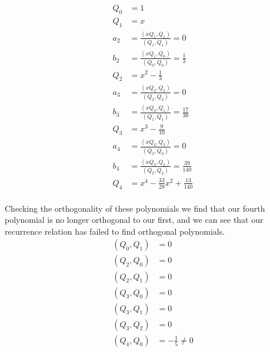 {\begin{align*}
Q_0 &= 1 \\
Q_1 &= x \\
a_2 &= \frac{(xQ_1,Q_1)}{(Q_1, Q_1)} = 0 \\
b_2 &= \frac{(xQ_1,Q_0)}{(Q_0, Q_0)} = \frac{1}{3} \\
Q_2 &= x^2 - \frac{1}{3} \\
a_3 &= \frac{(xQ_2,Q_2)}{(Q_2, Q_2)} = 0 \\
b_3 &= \frac{(xQ_2,Q_1)}{(Q_1, Q_1)} = \frac{17}{30} \\
Q_3 &= x^3 - \frac{9}{10} \\
a_4 &= \frac{(xQ_3,Q_3)}{(Q_3, Q_3)} = 0 \\
b_4 &= \frac{(xQ_3,Q_2)}{(Q_2, Q_2)} = \frac{39}{140} \\
Q_4 &= x^4 - \frac{33}{28} x^2 + \frac{13}{140} \\
\end{align*}

Checking the orthogonality of these polynomials we find that our
fourth polynomial is no longer orthogonal to our first, and we can see
that our recurrence relation has failed to find orthogonal polynomials.
\begin{align*}
(Q_0, Q_1) &= 0 \\
(Q_2, Q_0) &= 0 \\
(Q_2, Q_1) &= 0 \\
(Q_3, Q_0) &= 0 \\
(Q_3, Q_1) &= 0 \\
(Q_3, Q_2) &= 0 \\
(Q_4, Q_0) &\boxed{= -\frac{1}{5} \ne 0} \\
\end{align*}


}
